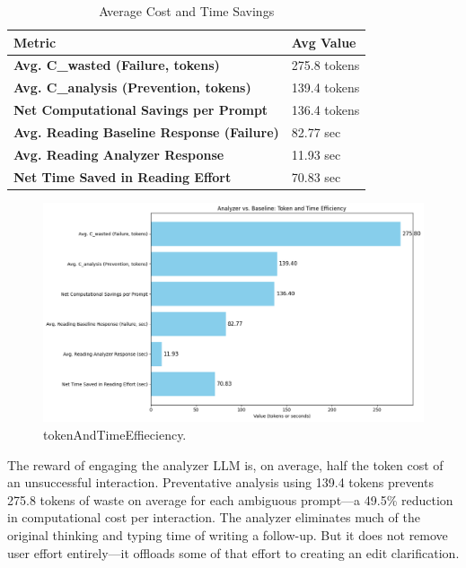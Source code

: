 \documentclass[conference]{IEEEtran}
\begin{document}
\begin{table}[H]
\caption{Average Cost and Time Savings}
\label{tab:results}
\centering
\begin{tabular}{@{}ll@{}}
\toprule
\textbf{Metric}                                & \textbf{Avg Value}  \\ \midrule
\textbf{Avg. C\_wasted (Failure, tokens)}      & 275.8 tokens \\
\textbf{Avg. C\_analysis (Prevention, tokens)} & 139.4 tokens \\
\textbf{Net Computational Savings per Prompt}  & 136.4 tokens \\
\textbf{Avg. Reading Baseline Response (Failure)} & 82.77 sec \\
\textbf{Avg. Reading Analyzer Response}           & 11.93 sec  \\
\textbf{Net Time Saved in Reading Effort}         & 70.83 sec  \\ \bottomrule
\end{tabular}
\end{table}

\begin{figure}[!t]
\centering
\includegraphics[width=\columnwidth]{images/Figure4.jpeg}
\caption{tokenAndTimeEffieciency.}
\label{fig_efficiency}
\end{figure}

The reward of engaging the analyzer LLM is, on average, half the token cost of an unsuccessful interaction. Preventative analysis using 139.4 tokens prevents 275.8 tokens of waste on average for each ambiguous prompt—a 49.5\% reduction in computational cost per interaction. The analyzer eliminates much of the original thinking and typing time of writing a follow-up. But it does not remove user effort entirely—it offloads some of that effort to creating an edit clarification.
\end{document}
